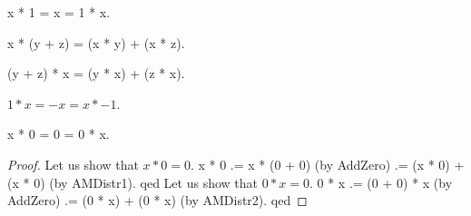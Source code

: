 \documentclass[a4paper,draft]{amsproc}
\begin{document}
\begin{forthel}
\begin{axiom}[MulUnit]
x * 1 = x = 1 * x.
\end{axiom}

\begin{axiom}[AMDistr1]
x * (y + z) = (x * y) + (x * z).
\end{axiom}

\begin{axiom}[AMDistr2]
(y + z) * x = (y * x) + (z * x).
\end{axiom}

\begin{axiom}[MulMnOne]
$1 * x = -x = x * -1$.
\end{axiom}

\begin{lemma}[MulZero]
x * 0 = 0 = 0 * x.
\end{lemma}
\begin{proof}
    Let us show that $x * 0 = 0$.
    x * 0 .= x * (0 + 0) (by AddZero) .= (x * 0) + (x * 0) (by AMDistr1).
    qed %
    Let us show that $0 * x = 0$.
    0 * x .= (0 + 0) * x (by AddZero) .= (0 * x) + (0 * x) (by AMDistr2).
    qed
\end{proof}
\end{forthel}
\end{document}
